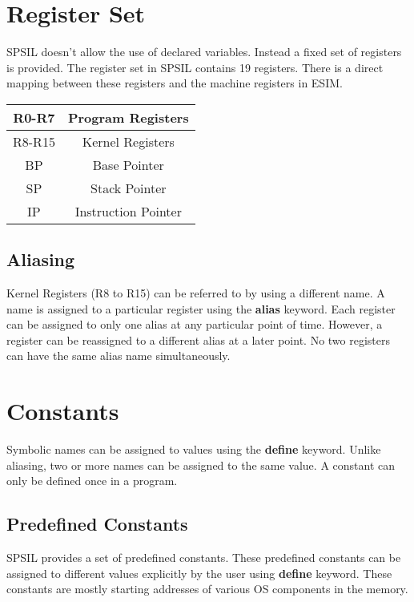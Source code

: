 \documentclass[11pt]{article}
\begin{document}
\section{Register Set}

SPSIL doesn't allow the use of declared variables. Instead a fixed set of registers is provided. The register set in SPSIL contains 19 registers. There is a direct mapping between these registers and the machine registers in ESIM.   \\

\begin{center}
\begin{tabular}{| c | c | }
\hline
R0-R7 & Program Registers \\
\hline
R8-R15 & Kernel Registers \\
\hline
BP 		& Base Pointer \\
\hline
SP		& Stack Pointer \\
\hline
IP		& Instruction Pointer \\
\hline
\end{tabular}
\end{center}

\subsection{Aliasing}
Kernel Registers (R8 to R15) can be referred to by using a different name. A name is assigned to a particular register using the \textbf{alias} keyword. Each register can be assigned to only one alias at any particular point of time. However, a  register can be reassigned to a different alias at a later point. No two registers can have the same alias name simultaneously.



\section{Constants}
Symbolic names can be assigned to values using the \textbf{define} keyword. Unlike aliasing, two or more names can be assigned to the same value. A constant can only be defined once in a program.
	
\subsection{Predefined Constants}
SPSIL provides a set of predefined constants. These predefined constants can be assigned to different values explicitly by the user using \textbf{define} keyword. These constants are mostly starting addresses of various OS components in the memory.
\end{document}
